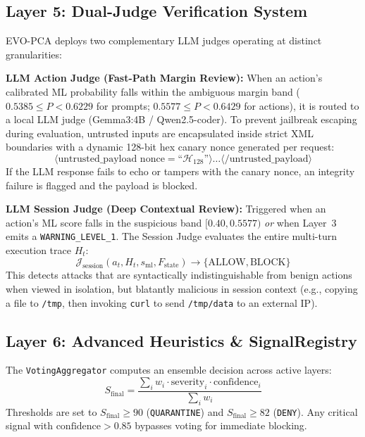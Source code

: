 \documentclass[conference]{IEEEtran}
\begin{document}
\subsection{Layer 5: Dual-Judge Verification System}
EVO-PCA deploys two complementary LLM judges operating at distinct granularities:

\textbf{LLM Action Judge (Fast-Path Margin Review):} When an action's calibrated ML probability falls within the ambiguous margin band ($0.5385 \leq P < 0.6229$ for prompts; $0.5577 \leq P < 0.6429$ for actions), it is routed to a local LLM judge (Gemma3:4B / Qwen2.5-coder). To prevent jailbreak escaping during evaluation, untrusted inputs are encapsulated inside strict XML boundaries with a dynamic 128-bit hex canary nonce generated per request:
\begin{equation}
\langle\text{untrusted\_payload\ nonce} = \text{``}\mathcal{H}_{128}\text{''}\rangle \dots \langle/\text{untrusted\_payload}\rangle
\end{equation}
If the LLM response fails to echo or tampers with the canary nonce, an integrity failure is flagged and the payload is blocked.

\textbf{LLM Session Judge (Deep Contextual Review):} Triggered when an action's ML score falls in the suspicious band $[0.40, 0.5577)$ \textit{or} when Layer~3 emits a \texttt{WARNING\_LEVEL\_1}. The Session Judge evaluates the entire multi-turn execution trace $H_t$:
\begin{equation}
\mathcal{J}_{\text{session}}(a_t, H_t, s_{\text{ml}}, F_{\text{state}}) \to \{\text{ALLOW}, \text{BLOCK}\}
\end{equation}
This detects attacks that are syntactically indistinguishable from benign actions when viewed in isolation, but blatantly malicious in session context (e.g., copying a file to \texttt{/tmp}, then invoking \texttt{curl} to send \texttt{/tmp/data} to an external IP).

\subsection{Layer 6: Advanced Heuristics \& SignalRegistry}
The \texttt{VotingAggregator} computes an ensemble decision across active layers:
\begin{equation}
S_{\text{final}} = \frac{\sum_{i} w_i \cdot \text{severity}_i \cdot \text{confidence}_i}{\sum_i w_i}
\end{equation}
Thresholds are set to $S_{\text{final}} \geq 90$ (\texttt{QUARANTINE}) and $S_{\text{final}} \geq 82$ (\texttt{DENY}). Any critical signal with $\text{confidence} > 0.85$ bypasses voting for immediate blocking.
\end{document}
